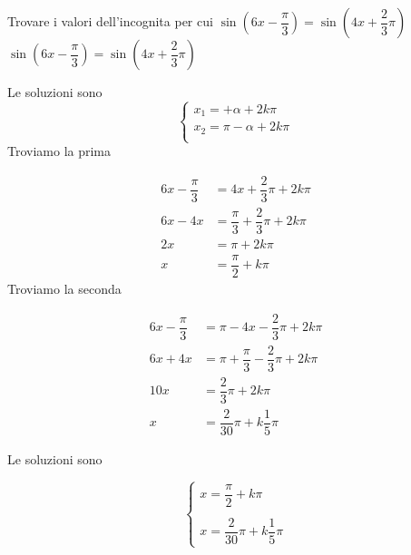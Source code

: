 \begin{exercise}
	Trovare i valori dell'incognita per cui $\sin(6x-\dfrac{\pi}{3})=\sin(4x +\dfrac{2}{3}\pi)$
	\tcblower
$\sin(6x-\dfrac{\pi}{3})=\sin(4x +\dfrac{2}{3}\pi)$
	
	Le soluzioni sono 
	\[\begin{cases}
	x_1=+\alpha+2k\pi\\
	x_2=\pi-\alpha+2k\pi\\
	\end{cases}\]
	Troviamo la prima
	
	\begin{align*}
	6x-\dfrac{\pi}{3}&=4x +\dfrac{2}{3}\pi+2k\pi\\
6x-4x&=\dfrac{\pi}{3} +\dfrac{2}{3}\pi+2k\pi\\
	2x&=\pi+2k\pi\\
	x&=\dfrac{\pi}{2}+k\pi
	\end{align*}
	Troviamo la seconda
	
	\begin{align*}
		6x-\dfrac{\pi}{3}&=\pi-4x-\dfrac{2}{3}\pi+2k\pi\\
		6x+4x&=\pi+\dfrac{\pi}{3}-\dfrac{2}{3}\pi+2k\pi\\
		10x&=\dfrac{2}{3}\pi+2k\pi\\
		x&=\dfrac{2}{30}\pi+k\dfrac{1}{5}\pi
	\end{align*}
	
	Le soluzioni sono
	
	\[\begin{cases}
		x=\dfrac{\pi}{2}+k\pi\\
		\\
	x=\dfrac{2}{30}\pi+k\dfrac{1}{5}\pi
	\end{cases}\]
\end{exercise}
